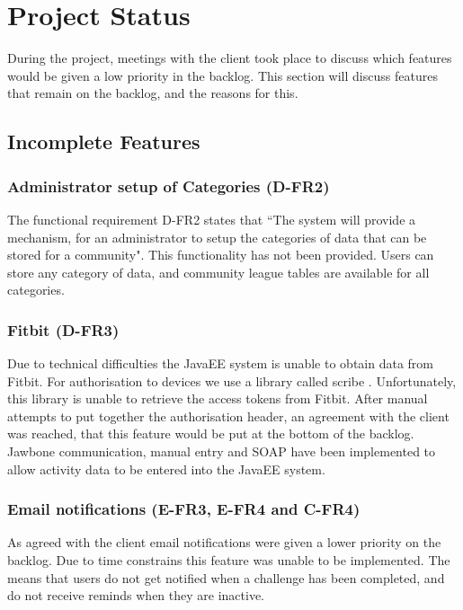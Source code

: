 \chapter{Project Status}

During the project, meetings with the client took place to discuss which features would be given a low priority in the backlog. This section will discuss features that remain on the backlog, and the reasons for this.

\section{Incomplete Features}

\subsection{Administrator setup of Categories (D-FR2)}
The functional requirement D-FR2 states that ``The system will provide a mechanism, for an administrator to setup the categories of data that can be stored for a community". This functionality has not been provided. Users can store any category of data, and community league tables are available for all categories.

\subsection{Fitbit (D-FR3)}
Due to technical difficulties the JavaEE system is unable to obtain data from Fitbit. For authorisation to devices we use a library called scribe \cite{scribe}. Unfortunately, this library is unable to retrieve the access tokens from Fitbit. After manual attempts to put together the authorisation header, an agreement with the client was reached, that this feature would be put at the bottom of the backlog. Jawbone communication, manual entry and SOAP have been implemented to allow activity data to be entered into the JavaEE system.

\subsection{Email notifications (E-FR3, E-FR4 and C-FR4)}

As agreed with the client email notifications were given a lower priority on the backlog. Due to time constrains this feature was unable to be implemented. The means that users do not get notified when a challenge has been completed, and do not receive reminds when they are inactive. 

